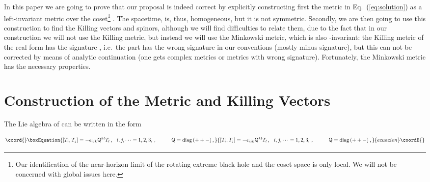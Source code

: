 \documentclass[12pt,a4paper]{article}
\begin{document}
In this paper we are going to prove that our proposal is indeed correct by
explicitly constructing first the metric in Eq.~(\ref{eq:solution}) as a
left-invariant metric over the coset\footnote{Our identification of the
  near-horizon limit of the rotating extreme black hole and the coset space is
  only local. We will not be concerned with global issues here.}
\coordHE{}.  The spacetime, is, thus,
homogeneous, but it is not symmetric. Secondly, we are then going to use this
construction to find the Killing vectors and spinors, although we will find
difficulties to relate them, due to the fact that in our construction we will
not use the Killing metric, but instead we will use the Minkowski metric,
which is also \coordHE{}-invariant: the Killing metric of the real form
\coordHE{} has the signature \myHighlight{$(--+---)$}\coordHE{}, i.e.~the \coordHE{} part
has the wrong signature in our conventions (mostly minus signature), but this
can not be corrected by means of analytic continuation (one gets complex
metrics or metrics with wrong signature). Fortunately, the Minkowski metric
has the necessary properties.


\section*{Construction of the Metric and Killing Vectors}

The Lie algebra of \coordHE{} can be written in the form

\begin{equation}\coord{}\boxEquation{
[T_{i},T_{j}]=-\epsilon_{ijk}\mathsf{Q}^{kl}T_{l}\, ,
\,\,\,\,
i,j,\cdots=1,2,3,\, ,  
\hspace{1cm}
\mathsf{Q}={\rm diag}\, (++-)\, , 
}{
[T_{i},T_{j}]=-\epsilon_{ijk}\mathsf{Q}^{kl}T_{l}\, ,
\,\,\,\,
i,j,\cdots=1,2,3,\, ,  
\hspace{1cm}
\mathsf{Q}={\rm diag}\, (++-)\, , 
}{ecuacion}\coordE{}\end{equation}
\end{document}
